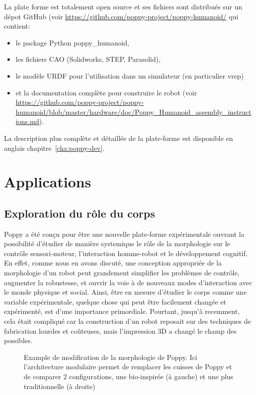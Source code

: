 La plate forme est totalement open source et ses fichiers sont distribués sur un dépot GitHub (voir \url{https://github.com/poppy-project/poppy-humanoid/} qui contient:

\begin{itemize}
  \item le package Python poppy\_humanoid,
  \item les fichiers CAO (Solidworks, STEP, Parasolid),
  \item le modèle URDF pour l'utilisation dans un simulateur (en particulier vrep) 
  \item et la documentation complète pour construire le robot (voir \url{https://github.com/poppy-project/poppy-humanoid/blob/master/hardware/doc/Poppy_Humanoid_assembly_instructions.md}).
\end{itemize}

La description plus complète et détaillée de la plate-forme est disponible en anglais chapitre~\ref{cha:poppy-dev}.



\section*{Applications} %


\subsection*{Exploration du rôle du corps} %
Poppy a été conçu pour être une nouvelle plate-forme expérimentale ouvrant la possibilité d'étudier de manière systemique le rôle de la morphologie sur le contrôle sensori-moteur, l'interaction homme-robot et le développement cognitif. En effet, comme nous en avons discuté, une conception appropriée de la morphologie d'un robot peut grandement simplifier les problèmes de contrôle, augmenter la robustesse, et ouvrir la voie à de nouveaux modes d'interaction avec le monde physique et social. Ainsi, être en mesure d'étudier le corps comme une variable expérimentale, quelque chose qui peut être facilement changée et expérimenté, est d'une importance primordiale. Pourtant, jusqu'à recemment, cela était compliqué car la construction d'un robot reposait sur des techniques de fabrication lourdes et coûteuses, mais l'impression 3D a changé le champ des possibles.

\begin{figure}[!t]
\centering
    \hfil
    \caption{Example de modification de la morphologie de Poppy. Ici l'architecture modulaire permet de remplacer les cuisses de Poppy et de comparer 2 configurations, une bio-inspirée (à gauche) et une plus traditionnelle (à droite)}
\end{figure}

